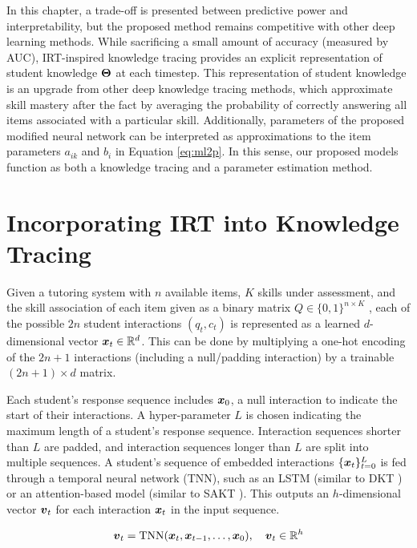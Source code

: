 In this chapter, a trade-off is presented between predictive power and interpretability, but the proposed method remains competitive with other deep learning methods. While sacrificing a small amount of accuracy (measured by AUC), IRT-inspired knowledge tracing provides an explicit representation of student knowledge $\boldsymbol{\Theta}$ at each timestep. This representation of student knowledge is an upgrade from other deep knowledge tracing methods, which approximate skill mastery after the fact by averaging the probability of correctly answering all items associated with a particular skill. Additionally, parameters of the proposed modified neural network can be interpreted as approximations to the item parameters $a_{ik}$ and $b_i$ in Equation \ref{eq:ml2p}. In this sense, our proposed models function as both a knowledge tracing and a parameter estimation method.


\section{Incorporating IRT into Knowledge Tracing} \label{sec:kt_irt_methods}
Given a tutoring system with $n$ available items, $K$ skills under assessment, and the skill association of each item given as a binary matrix $Q \in \{0,1\}^{n \times K}$ \cite{daSilva2018}, each of the possible $2n$ student interactions $(q_t, c_t)$ is represented as a learned $d$-dimensional vector $\boldsymbol{x}_t \in \mathbb{R}^d$. This can be done by multiplying a one-hot encoding of the $2n+1$ interactions (including a null/padding interaction) by a trainable $(2n+1) \times d$ matrix.

Each student's response sequence includes $\boldsymbol{x}_0$, a null interaction to indicate the start of their interactions. A hyper-parameter $L$ is chosen indicating the maximum length of a student's response sequence. Interaction sequences shorter than $L$ are padded, and interaction sequences longer than $L$ are split into multiple sequences. A student's sequence of embedded interactions $\{\boldsymbol{x}_t\}_{t=0}^L$ is fed through a temporal neural network (TNN), such as an LSTM (similar to DKT \cite{piech2015}) or an attention-based model (similar to SAKT \cite{pandey2019}). This outputs an $h$-dimensional vector $\boldsymbol{v}_t$ for each interaction $\boldsymbol{x}_t$ in the input sequence.

\begin{equation}
  \boldsymbol{v}_t = \text{TNN}(\boldsymbol{x}_t, \boldsymbol{x}_{t-1}, \ldots, \boldsymbol{x}_0), \quad \boldsymbol{v}_t \in \mathbb{R}^h
  \label{eq:tsnn_layer}
\end{equation}

